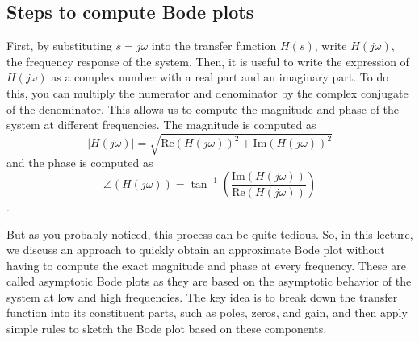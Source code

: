 \documentclass{ee122_notes}
\begin{document}
\subsection{Steps to compute Bode plots}
First, by substituting \( s = j\omega \) into the transfer function \( H(s) \), write \( H(j\omega) \), the frequency response of the system. Then, it is useful to write the expression of \( H(j\omega) \) as a complex number with a real part and an imaginary part. To do this, you can multiply the numerator and denominator by the complex conjugate of the denominator. This allows us to compute the magnitude and phase of the system at different frequencies. The magnitude is computed as \[ |H(j\omega)| = \sqrt{\text{Re}(H(j\omega))^2 + \text{Im}(H(j\omega))^2} \] and the phase is computed as \[ \angle (H(j\omega)) = \tan^{-1}\left(\frac{\text{Im}(H(j\omega))}{\text{Re}(H(j\omega))}\right) \]. 

But as you probably noticed, this process can be quite tedious. So, in this lecture, we discuss an approach to quickly obtain an approximate Bode plot without having to compute the exact magnitude and phase at every frequency. These are called asymptotic Bode plots as they are based on the asymptotic behavior of the system at low and high frequencies. The key idea is to break down the transfer function into its constituent parts, such as poles, zeros, and gain, and then apply simple rules to sketch the Bode plot based on these components.
\end{document}
